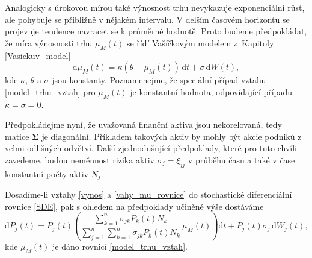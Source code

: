 \documentclass[a4paper,12pt]{report}
\theoremstyle{definition} \newtheorem{definice}[veta]{Definice}
\theoremstyle{remark}
\begin{document}
Analogicky s úrokovou mírou také výnosnost trhu nevykazuje exponenciální růst, ale pohybuje se přibližně v nějakém intervalu. 
V delším časovém horizontu se projevuje tendence navracet se k průměrné hodnotě.
Proto budeme předpokládat, že míra výnosnosti trhu $\mu_M(t)$ se řídí Vašíčkovým modelem z~Kapitoly \ref{Vasickuv_model}
\begin{equation} \label{model_trhu_vztah}
\mathrm{d}\mu_M(t)=\kappa(\theta-\mu_M(t))\,\mathrm{d}t+\sigma\,\mathrm{d}W(t),
\end{equation}
kde $\kappa$, $\theta$ a $\sigma$ jsou konstanty.
Poznamenejme, že speciální případ vztahu \eqref{model_trhu_vztah} pro $\mu_M(t)$ je konstantní hodnota, odpovídající případu $\kappa=\sigma=0$.

Předpokládejme nyní, že uvažovaná finanční aktiva jsou nekorelovaná, tedy matice $\boldsymbol{\Sigma}$ je diagonální.
Příkladem takových aktiv by mohly být akcie podniků z velmi odlišných odvětví.
Další zjednodušující předpoklady, které pro tuto chvíli zavedeme, budou neměnnost rizika aktiv $\sigma_j=\xi_{jj}$ v průběhu času a také v čase konstantní počty aktiv $N_j$.

Dosadíme-li vztahy \eqref{vynos} a \eqref{vahy_mu_rovnice} do stochastické diferenciální rovnice \eqref{SDE}, pak s ohledem na předpoklady učiněné výše dostáváme
\begin{equation}  \label{SDE_cen_diag}
\mathrm{d}P_j(t)=P_j(t)\left(\frac{\sum\limits_{k=1}^n\sigma_{jk}P_k(t)N_k}{\sum\limits_{j=1}^n\sum\limits_{k=1}^n\sigma_{jk}P_k(t)N_k}\, \mu_M(t)\right)\mathrm{d}t+P_j(t)\sigma_{j}\,\mathrm{d}W_j(t),
\end{equation}
kde $\mu_M(t)$ je dáno rovnicí \eqref{model_trhu_vztah}.
\end{document}
